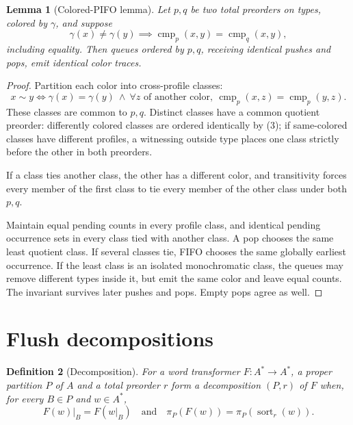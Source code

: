 \documentclass[11pt]{article}
\newtheorem{definition}{Definition}
\newtheorem{lemma}[definition]{Lemma}
\begin{document}
\begin{lemma}[Colored-PIFO lemma]
Let $p,q$ be two total preorders on types, colored by $\gamma$, and suppose
\begin{equation}
\gamma(x)\ne\gamma(y)
\implies
\operatorname{cmp}_p(x,y)=\operatorname{cmp}_q(x,y),
\tag{3}
\end{equation}
including equality.  Then queues ordered by $p,q$, receiving identical pushes and pops, emit identical color traces.
\end{lemma}

\begin{proof}
Partition each color into cross-profile classes:
\[
x\sim y
\iff
\gamma(x)=\gamma(y)
\ \land\
\forall z\text{ of another color},\
\operatorname{cmp}_p(x,z)=\operatorname{cmp}_p(y,z).
\]
These classes are common to $p,q$.  Distinct classes have a common quotient preorder: differently colored classes are ordered identically by (3); if same-colored classes have different profiles, a witnessing outside type places one class strictly before the other in both preorders.

If a class ties another class, the other has a different color, and transitivity forces every member of the first class to tie every member of the other class under both $p,q$.

Maintain equal pending counts in every profile class, and identical pending occurrence sets in every class tied with another class.  A pop chooses the same least quotient class.  If several classes tie, FIFO chooses the same globally earliest occurrence.  If the least class is an isolated monochromatic class, the queues may remove different types inside it, but emit the same color and leave equal counts.  The invariant survives later pushes and pops.  Empty pops agree as well.
\end{proof}

\section{Flush decompositions}

\begin{definition}[Decomposition]
For a word transformer $F\colon A^*\to A^*$, a proper partition $P$ of $A$ and a total preorder $r$ form a \emph{decomposition} $(P,r)$ of $F$ when, for every $B\in P$ and $w\in A^*$,
\[
F(w)|_B=F(w|_B)
\quad\text{and}\quad
\pi_P(F(w))=\pi_P(\operatorname{sort}_r(w)).
\]
\end{definition}
\end{document}
